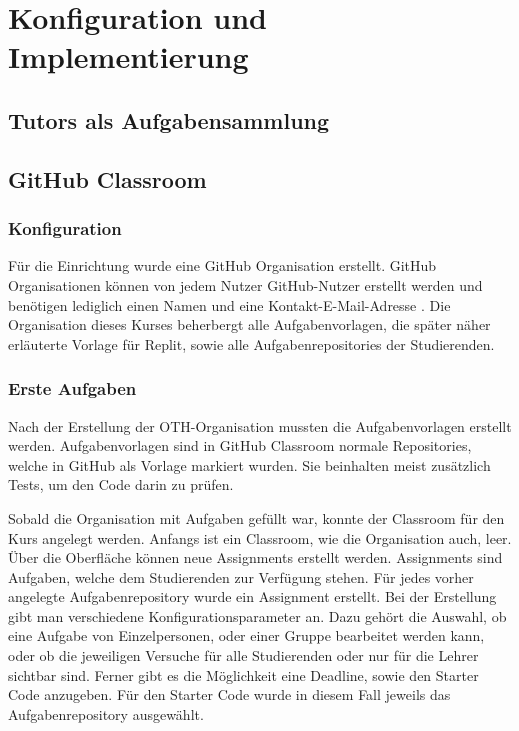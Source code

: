 \section{Konfiguration und Implementierung}

\subsection{Tutors als Aufgabensammlung}

\subsection{GitHub Classroom}
\subsubsection{Konfiguration}
Für die Einrichtung wurde eine GitHub Organisation erstellt. GitHub
Organisationen können von jedem Nutzer GitHub-Nutzer erstellt werden und
benötigen lediglich einen Namen und eine Kontakt-E-Mail-Adresse
\cite{github-organisation-erstellen}. Die Organisation dieses Kurses beherbergt
alle Aufgabenvorlagen, die später näher erläuterte Vorlage für Replit, sowie
alle Aufgabenrepositories der Studierenden.

\subsubsection{Erste Aufgaben}
Nach der Erstellung der OTH-Organisation mussten die Aufgabenvorlagen erstellt
werden. Aufgabenvorlagen sind in GitHub Classroom normale Repositories, welche
in GitHub als Vorlage markiert wurden. Sie beinhalten meist zusätzlich Tests, um
den Code darin zu prüfen.

Sobald die Organisation mit Aufgaben gefüllt war, konnte der
\glqq Classroom\grqq{} für den Kurs angelegt werden. Anfangs ist ein Classroom,
wie die Organisation auch, leer. Über die Oberfläche können neue Assignments
erstellt werden. Assignments sind Aufgaben, welche dem Studierenden zur
Verfügung stehen. Für jedes vorher angelegte Aufgabenrepository wurde ein
Assignment erstellt. Bei der Erstellung gibt man verschiedene
Konfigurationsparameter an. Dazu gehört die Auswahl, ob eine Aufgabe von
Einzelpersonen, oder einer Gruppe bearbeitet werden kann, oder ob die jeweiligen
Versuche für alle Studierenden oder nur für die Lehrer sichtbar sind. Ferner
gibt es die Möglichkeit eine Deadline, sowie den Starter Code anzugeben. Für den
Starter Code wurde in diesem Fall jeweils das Aufgabenrepository ausgewählt.
\cite{github-assignment-erstellen}
